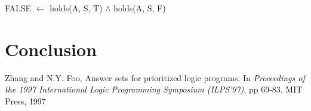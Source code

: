 \documentclass{llncs}
\begin{document}
        FALSE $\leftarrow$ holds(A, S, T) $\land$ holds(A, S, F)

  \section{Conclusion}

  \begin{thebibliography}{5}

      Zhang and N.Y. Foo,
      Answer sets for prioritized logic programs.
      In {\em Proceedings of the 1997 International Logic Programming
      Symposium (ILPS'97)},
      pp 69-83. 
      MIT Press, 1997

  \end{thebibliography}
\end{document}
